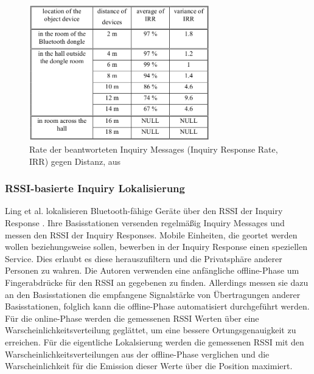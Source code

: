 \begin{figure}[h]
  \centering
	\includegraphics[width=0.7\textwidth]{images/irr.png}
  \caption{Rate der beantworteten Inquiry Messages (Inquiry Response Rate, IRR) gegen Distanz, aus \cite{bargh2008indoor}}
  \label{fig:blemodel}
\end{figure}

\subsubsection{RSSI-basierte Inquiry Lokalisierung}
Ling et al. lokalisieren Bluetooth-fähige Geräte über den RSSI der Inquiry Response \cite{ling2010inquiry}.
Ihre Basisstationen versenden regelmäßig Inquiry Messages und messen den RSSI der Inquiry Responses.
Mobile Einheiten, die geortet werden wollen beziehungsweise sollen, bewerben in der Inquiry Response einen speziellen Service.
Dies erlaubt es diese herauszufiltern und die Privatsphäre anderer Personen zu wahren.
Die Autoren verwenden eine anfängliche offline-Phase um Fingerabdrücke für den RSSI an gegebenen zu finden.
Allerdings messen sie dazu an den Basisstationen die empfangene Signalstärke von Übertragungen anderer Basisstationen, folglich kann die offline-Phase automatisiert durchgeführt werden.
Für die online-Phase werden die gemessenen RSSI Werten über eine Warscheinlichkeitsverteilung geglättet, um eine bessere Ortungsgenauigkeit zu erreichen.
Für die eigentliche Lokalsierung werden die gemessenen RSSI mit den Warscheinlichkeitsverteilungen aus der offline-Phase verglichen und die Warscheinlichkeit für die Emission dieser Werte über die Position maximiert.

